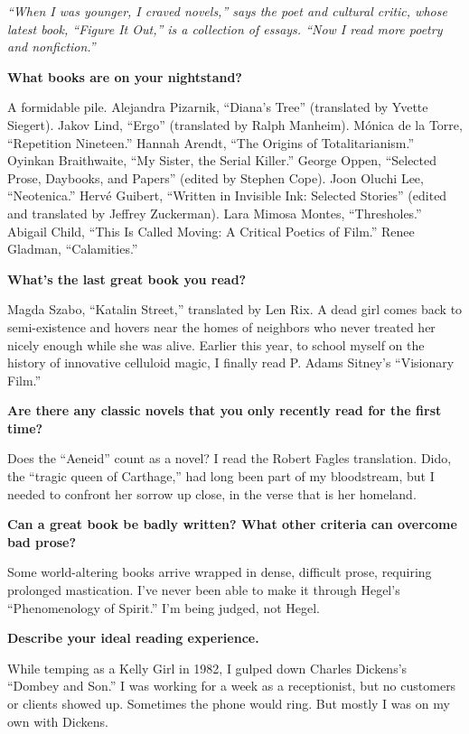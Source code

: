 \emph{``When I was younger, I craved novels,'' says the poet and
cultural critic, whose latest book, ``Figure It Out,'' is a collection
of essays. ``Now I read more poetry and nonfiction.''}

\textbf{What books are on your nightstand?}

A formidable pile. Alejandra Pizarnik, ``Diana's Tree'' (translated by
Yvette Siegert). Jakov Lind, ``Ergo'' (translated by Ralph Manheim).
Mónica de la Torre, ``Repetition Nineteen.'' Hannah Arendt, ``The
Origins of Totalitarianism.'' Oyinkan Braithwaite, ``My Sister, the
Serial Killer.'' George Oppen, ``Selected Prose, Daybooks, and Papers''
(edited by Stephen Cope). Joon Oluchi Lee, ``Neotenica.'' Hervé Guibert,
``Written in Invisible Ink: Selected Stories'' (edited and translated by
Jeffrey Zuckerman). Lara Mimosa Montes, ``Thresholes.'' Abigail Child,
``This Is Called Moving: A Critical Poetics of Film.'' Renee Gladman,
``Calamities.''

\textbf{What's the last great book you read?}

Magda Szabo, ``Katalin Street,'' translated by Len Rix. A dead girl
comes back to semi-existence and hovers near the homes of neighbors who
never treated her nicely enough while she was alive. Earlier this year,
to school myself on the history of innovative celluloid magic, I finally
read P. Adams Sitney's ``Visionary Film.''

\textbf{Are there any classic novels that you only recently read for the
first time?}

Does the ``Aeneid'' count as a novel? I read the Robert Fagles
translation. Dido, the ``tragic queen of Carthage,'' had long been part
of my bloodstream, but I needed to confront her sorrow up close, in the
verse that is her homeland.

\textbf{Can a great book be badly written? What other criteria can
overcome bad prose?}

Some world-altering books arrive wrapped in dense, difficult prose,
requiring prolonged mastication. I've never been able to make it through
Hegel's ``Phenomenology of Spirit.'' I'm being judged, not Hegel.

\textbf{Describe your ideal reading experience.}

While temping as a Kelly Girl in 1982, I gulped down Charles Dickens's
``Dombey and Son.'' I was working for a week as a receptionist, but no
customers or clients showed up. Sometimes the phone would ring. But
mostly I was on my own with Dickens.

